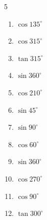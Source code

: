 \begin{multicols}{5}
\begin{enumerate}
        \phantom{$\displaystyle =-1$}

  \item $\displaystyle \cos{135^\circ}$


  \item $\displaystyle \cos{315^\circ}$


\columnbreak %

\resetques

  \item $\displaystyle \tan{315^\circ}$

        \phantom{$\displaystyle =-1$}

  \item $\displaystyle \sin{360^\circ}$

        \phantom{$\displaystyle =0$}

  \item $\displaystyle \cos{210^\circ}$


  \item $\displaystyle \sin{45^\circ}$


  \item $\displaystyle \sin{90^\circ}$

        \phantom{$\displaystyle =1$}

  \item $\displaystyle \cos{60^\circ}$


  \item $\displaystyle \sin{360^\circ}$

        \phantom{$\displaystyle =0$}

  \item $\displaystyle \cos{270^\circ}$

        \phantom{$\displaystyle =0$}

  \item $\displaystyle \cos{90^\circ}$

        \phantom{$\displaystyle =0$}

  \item $\displaystyle \tan{300^\circ}$



\end{enumerate}
\end{multicols}
